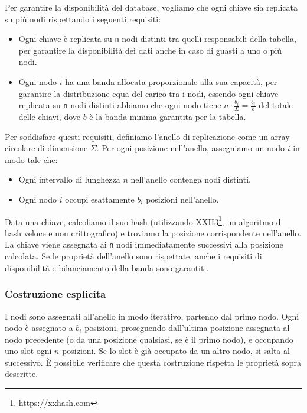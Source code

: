 Per garantire la disponibilità del database, vogliamo che ogni chiave sia replicata su più nodi rispettando i seguenti requisiti:

\begin{itemize}
    \item Ogni chiave è replicata su \texttt{n} nodi distinti tra quelli responsabili della tabella, per garantire la disponibilità dei dati anche in caso di guasti a uno o più nodi.
    \item Ogni nodo $i$ ha una banda allocata proporzionale alla sua capacità, per garantire la distribuzione equa del carico tra i nodi, essendo ogni chiave replicata su \texttt{n} nodi distinti abbiamo che ogni nodo tiene $n \cdot \frac{b_i}{\Sigma} = \frac{b_i}{b}$ del totale delle chiavi, dove $b$ è la banda minima garantita per la tabella.
\end{itemize}

Per soddisfare questi requisiti, definiamo l'anello di replicazione come un array circolare di dimensione $\Sigma$.
Per ogni posizione nell'anello, assegniamo un nodo $i$ in modo tale che:

\begin{itemize}
    \item Ogni intervallo di lunghezza $n$ nell'anello contenga nodi distinti.
    \item Ogni nodo $i$ occupi esattamente $b_i$ posizioni nell'anello.
\end{itemize}

Data una chiave, calcoliamo il suo hash (utilizzando XXH3\footnote{\url{https://xxhash.com}}, un algoritmo di hash veloce e non crittografico) e troviamo la posizione corrispondente nell'anello.
La chiave viene assegnata ai \texttt{n} nodi immediatamente successivi alla posizione calcolata.
Se le proprietà dell'anello sono rispettate, anche i requisiti di disponibilità e bilanciamento della banda sono garantiti.

\subsubsection{Costruzione esplicita}
\label{subsubsec:costruzione-esplicita}

I nodi sono assegnati all'anello in modo iterativo, partendo dal primo nodo.
Ogni nodo è assegnato a $b_i$ posizioni, proseguendo dall'ultima posizione assegnata al nodo precedente (o da una posizione qualsiasi, se è il primo nodo), e occupando uno slot ogni $n$ posizioni.
Se lo slot è già occupato da un altro nodo, si salta al successivo.
È possibile verificare che questa costruzione rispetta le proprietà sopra descritte.

